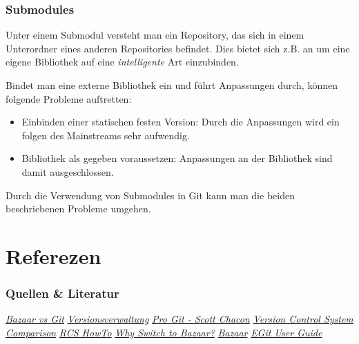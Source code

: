 \documentclass{beamer}
\begin{document}
\begin{frame}\frametitle{Submodules}
Unter einem Submodul versteht man ein Repository, das sich in einem Unterordner eines anderen Repositories befindet. Dies bietet sich z.B. an um eine eigene Bibliothek auf eine \textit{intelligente} Art einzubinden. 

Bindet man eine externe Bibliothek ein und führt Anpassungen durch, können folgende Probleme auftretten:
\begin{itemize}                
	\item Einbinden einer statischen festen Version: Durch die Anpassungen wird ein folgen des Mainstreams sehr aufwendig. 
	\item Bibliothek als gegeben voraussetzen: Anpassungen an der Bibliothek sind damit ausgeschlossen. 
\end{itemize}

Durch die Verwendung von Submodules in Git kann man die beiden beschriebenen Probleme umgehen.
\end{frame}

\section[Quellen]{Referezen}

\begin{frame}\frametitle{Quellen \& Literatur}
\begin{thebibliography}{9}
 \emph{\href{http://wiki.bazaar.canonical.com/BzrVsGit}{Bazaar vs Git}}
 \emph{\href{http://de.wikipedia.org/wiki/Versionsverwaltung}{Versionsverwaltung}}
 \emph{\href{http://progit.org/}{Pro Git - Scott Chacon}}
 \emph{\href{http://better-scm.shlomifish.org/comparison/comparison.html}{Version Control System Comparison}}
 \emph{\href{http://www.madboa.com/geek/rcs/} {RCS HowTo}}
 \emph{\href{http://doc.bazaar.canonical.com/migration/en/why-switch-to-bazaar.html}{Why Switch to Bazaar?}}
 \emph{\href{http://wiki.ubuntuusers.de/Bazaar}{Bazaar}}
 \emph{\href{http://wiki.eclipse.org/EGit/User\_Guide} {EGit User Guide}}
\end{thebibliography}
\end{frame}
\end{document}
